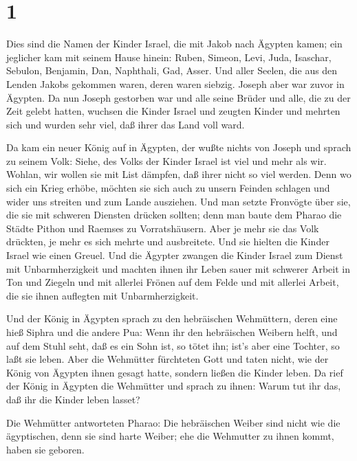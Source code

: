 \hypertarget{section}{%
\section{1}\label{section}}

 Dies sind die Namen der Kinder Israel, die mit Jakob nach
Ägypten kamen; ein jeglicher kam mit seinem Hause hinein: 
Ruben, Simeon, Levi, Juda,  Isaschar, Sebulon, Benjamin,
 Dan, Naphthali, Gad, Asser.  Und aller Seelen,
die aus den Lenden Jakobs gekommen waren, deren waren siebzig. Joseph
aber war zuvor in Ägypten.  Da nun Joseph gestorben war und
alle seine Brüder und alle, die zu der Zeit gelebt hatten, 
wuchsen die Kinder Israel und zeugten Kinder und mehrten sich und wurden
sehr viel, daß ihrer das Land voll ward.

 Da kam ein neuer König auf in Ägypten, der wußte nichts von
Joseph  und sprach zu seinem Volk: Siehe, des Volks der
Kinder Israel ist viel und mehr als wir.  Wohlan, wir
wollen sie mit List dämpfen, daß ihrer nicht so viel werden. Denn wo
sich ein Krieg erhöbe, möchten sie sich auch zu unsern Feinden schlagen
und wider uns streiten und zum Lande ausziehen.  Und man
setzte Fronvögte über sie, die sie mit schweren Diensten drücken
sollten; denn man baute dem Pharao die Städte Pithon und Raemses zu
Vorratshäusern.  Aber je mehr sie das Volk drückten, je
mehr es sich mehrte und ausbreitete. Und sie hielten die Kinder Israel
wie einen Greuel.  Und die Ägypter zwangen die Kinder
Israel zum Dienst mit Unbarmherzigkeit  und machten ihnen
ihr Leben sauer mit schwerer Arbeit in Ton und Ziegeln und mit allerlei
Frönen auf dem Felde und mit allerlei Arbeit, die sie ihnen auflegten
mit Unbarmherzigkeit.

 Und der König in Ägypten sprach zu den hebräischen
Wehmüttern, deren eine hieß Siphra und die andere Pua: 
Wenn ihr den hebräischen Weibern helft, und auf dem Stuhl seht, daß es
ein Sohn ist, so tötet ihn; ist's aber eine Tochter, so laßt sie leben.
 Aber die Wehmütter fürchteten Gott und taten nicht, wie
der König von Ägypten ihnen gesagt hatte, sondern ließen die Kinder
leben.  Da rief der König in Ägypten die Wehmütter und
sprach zu ihnen: Warum tut ihr das, daß ihr die Kinder leben lasset?

 Die Wehmütter antworteten Pharao: Die hebräischen Weiber
sind nicht wie die ägyptischen, denn sie sind harte Weiber; ehe die
Wehmutter zu ihnen kommt, haben sie geboren.

